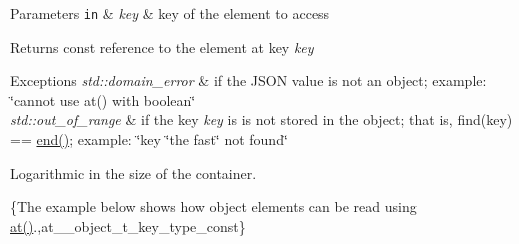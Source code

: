\begin{DoxyParams}[1]{Parameters}
\mbox{\tt in}  & {\em key} & key of the element to access\\
\hline
\end{DoxyParams}
\begin{DoxyReturn}{Returns}
const reference to the element at key {\itshape key} 
\end{DoxyReturn}

\begin{DoxyExceptions}{Exceptions}
{\em std\-::domain\-\_\-error} & if the J\-S\-O\-N value is not an object; example\-: {\ttfamily \char`\"{}cannot use at() with boolean\char`\"{}} \\
\hline
{\em std\-::out\-\_\-of\-\_\-range} & if the key {\itshape key} is is not stored in the object; that is, {\ttfamily find(key) == \hyperlink{classnlohmann_1_1basic__json_a12ccf14d39ddae52f6c7e126105a230b}{end()}}; example\-: {\ttfamily \char`\"{}key \char`\"{}the fast\char`\"{} not found\char`\"{}}\\
\hline
\end{DoxyExceptions}
Logarithmic in the size of the container.

\{The example below shows how object elements can be read using {\ttfamily \hyperlink{classnlohmann_1_1basic__json_a214a8c22d616fd3567b88932c07436c9}{at()}}.,at\-\_\-\-\_\-object\-\_\-t\-\_\-key\-\_\-type\-\_\-const\}

